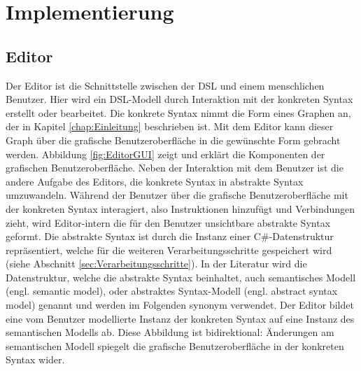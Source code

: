 \chapter{Implementierung}
\label{chap:Implementierung}

\section{Editor}
\label{sec:Editor}
Der Editor ist die Schnittstelle zwischen der DSL und einem menschlichen Benutzer. Hier wird ein DSL-Modell durch Interaktion mit der konkreten Syntax erstellt oder bearbeitet. Die konkrete Syntax nimmt die Form eines Graphen an, der in Kapitel \ref{chap:Einleitung} beschrieben ist. Mit dem Editor kann dieser Graph über die grafische Benutzeroberfläche in die gewünschte Form gebracht werden. Abbildung \ref{fig:EditorGUI} zeigt und erklärt die Komponenten der grafischen Benutzeroberfläche.
\newline 
Neben der Interaktion mit dem Benutzer ist die andere Aufgabe des Editors, die konkrete Syntax in abstrakte Syntax umzuwandeln. Während der Benutzer über die grafische Benutzeroberfläche mit der konkreten Syntax interagiert, also Instruktionen hinzufügt und Verbindungen zieht, wird Editor-intern die für den Benutzer unsichtbare abstrakte Syntax geformt. Die abstrakte Syntax ist durch die Instanz einer C\#-Datenstruktur repräsentiert, welche für die weiteren Verarbeitungsschritte gespeichert wird (siehe Abschnitt \ref{sec:Verarbeitungsschritte}). In der Literatur wird die Datenstruktur, welche die abstrakte Syntax beinhaltet, auch semantisches Modell (engl. semantic model)\cite[S. 159ff]{Fowler:11}, oder abstraktes Syntax-Modell (engl. abstract syntax model)\cite[S. 78ff]{Kleppe:09} genannt und werden im Folgenden synonym verwendet. Der Editor bildet eine vom Benutzer modellierte Instanz der konkreten Syntax auf eine Instanz des semantischen Modells ab. Diese Abbildung ist bidirektional: Änderungen am semantischen Modell spiegelt die grafische Benutzeroberfläche in der konkreten Syntax wider. 
\newline
